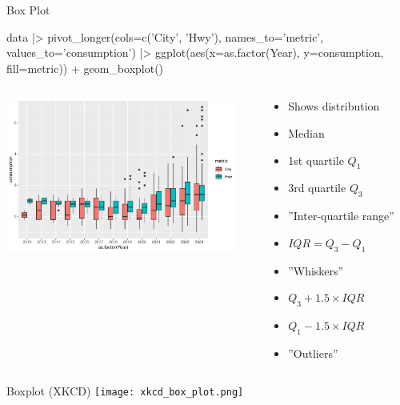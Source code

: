 \documentclass[ignorenonframetext,xcolor=x11names]{beamer}
\begin{document}
\begin{frame}[fragile]{Box Plot}

\begin{Rcode}
data |>
  pivot_longer(cols=c('City', 'Hwy'), 
               names_to='metric', values_to='consumption') |>
ggplot(aes(x=as.factor(Year), y=consumption, fill=metric)) +
  geom_boxplot()
\end{Rcode}
\begin{columns}
\begin{column}{.75\textwidth}
  \includegraphics[height=2in]{fuel.box.pdf}
\end{column}
\hspace{-.5in}
\begin{column}{.35\textwidth}
\footnotesize
\begin{itemize}
   \item Shows distribution
   \item Median
   \item 1st quartile $Q_1$
   \item 3rd quartile $Q_3$
   \item ''Inter-quartile range''
   \item $IQR = Q_3 - Q_1$
   \item ''Whiskers''
   \item $Q_3 + 1.5 \times IQR$
   \item $Q_1 - 1.5 \times IQR$
   \item ''Outliers''
\end{itemize}
\end{column}
\end{columns}
\end{frame}


\begin{frame}{Boxplot (XKCD)}
 \texttt{[image: xkcd\_box\_plot.png]}
\end{frame}
\end{document}
